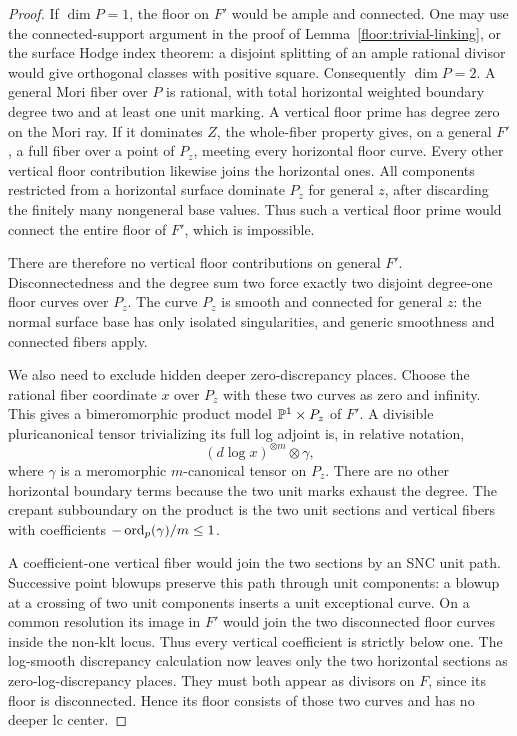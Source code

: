 \begin{proof}
If $\dim P=1$, the floor on $F'$ would be
ample and connected.  One may use the
connected-support argument in the proof of
Lemma~\ref{floor:trivial-linking}, or the
surface Hodge index theorem: a disjoint
splitting of an ample rational divisor would
give orthogonal classes with positive square.
Consequently $\dim P=2$.  A general Mori
fiber over $P$ is rational, with total
horizontal weighted boundary degree two and
at least one unit marking.  A vertical floor
prime has degree zero on the Mori ray.  If
it dominates $Z$, the whole-fiber property
gives, on a general $F'$, a full fiber over
a point of $P_z$, meeting every horizontal
floor curve.  Every other vertical floor
contribution likewise joins the horizontal
ones.  All components restricted from a
horizontal surface dominate $P_z$ for
general $z$, after discarding the finitely
many nongeneral base values.  Thus such a
vertical floor prime would connect the
entire floor of $F'$, which is impossible.

There are therefore no vertical floor
contributions on general $F'$.  Disconnectedness
and the degree sum two force exactly two
disjoint degree-one floor curves over $P_z$.
The curve $P_z$ is smooth and connected for
general $z$: the normal surface base has
only isolated singularities, and generic
smoothness and connected fibers apply.

We also need to exclude hidden deeper
zero-discrepancy places.  Choose the rational
fiber coordinate $x$ over $P_z$ with these
two curves as zero and infinity.  This gives
a bimeromorphic product model
$\mathbb{P}^1\times P_z$ of $F'$.  A divisible
pluricanonical tensor trivializing its full
log adjoint is, in relative notation,
\begin{equation}
 \label{floor:surface-dlog-product}
 (d\log x)^{\otimes m}\otimes\gamma,
\end{equation}
where $\gamma$ is a meromorphic
$m$-canonical tensor on $P_z$.  There are
no other horizontal boundary terms because
the two unit marks exhaust the degree.
The crepant subboundary on the product is
the two unit sections and vertical fibers
with coefficients
$-\operatorname{ord}_p(\gamma)/m\le1$.

A coefficient-one vertical fiber would
join the two sections by an SNC unit path.
Successive point blowups preserve this
path through unit components: a blowup at
a crossing of two unit components inserts
a unit exceptional curve.  On a common
resolution its image in $F'$ would join
the two disconnected floor curves inside
the non-klt locus.  Thus every vertical
coefficient is strictly below one.  The
log-smooth discrepancy calculation now
leaves only the two horizontal sections
as zero-log-discrepancy places.  They
must both appear as divisors on $F$, since
its floor is disconnected.  Hence its
floor consists of those two curves and
has no deeper lc center.


\end{proof}
